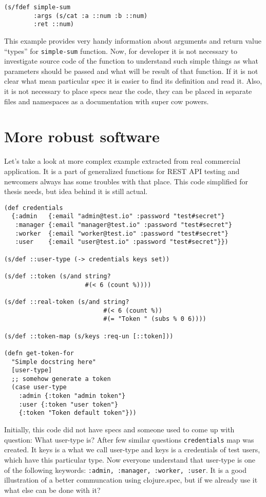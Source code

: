 \begin{verbatim}
(s/fdef simple-sum
        :args (s/cat :a ::num :b ::num)
        :ret ::num)
\end{verbatim}
This example provides very handy information about arguments and return value
``types'' for \texttt{simple-sum} function. Now, for developer it is not
necessary to investigate source code of the function to understand such simple
things as what parameters should be passed and what will be result of that
function. If it is not clear what mean particular spec it is easier to find its
definition and read it. Also, it is not necessary to place specs near the code,
they can be placed in separate files and namespaces as a documentation with
super cow powers.


\section{More robust software}

Let's take a look at more complex example extracted from real
commercial application. It is a part of generalized functions for REST API
testing and newcomers always has some troubles with that place. This code
simplified for thesis needs, but idea behind it is still actual.

\begin{verbatim}
(def credentials
  {:admin   {:email "admin@test.io" :password "test#secret"}
   :manager {:email "manager@test.io" :password "test#secret"}
   :worker  {:email "worker@test.io" :password "test#secret"}
   :user    {:email "user@test.io" :password "test#secret"}})

(s/def ::user-type (-> credentials keys set))

(s/def ::token (s/and string?
                      #(< 6 (count %))))

(s/def ::real-token (s/and string?
                           #(< 6 (count %))
                           #(= "Token " (subs % 0 6))))

(s/def ::token-map (s/keys :req-un [::token]))

(defn get-token-for
  "Simple docstring here"
  [user-type]
  ;; somehow generate a token
  (case user-type
    :admin {:token "admin token"}
    :user {:token "user token"}
    {:token "Token default token"}))
\end{verbatim}


Initially, this code did not have specs and someone used to come up with
question: What user-type is? After few similar questions
\texttt{credentials} map was created. It keys is a what we call user-type and
keys is a credentials of test users, which have this particular type. Now
everyone understand that user-type is one of the following keywords:
\texttt{:admin, :manager, :worker, :user}. It is a good illustration of a better
communcation using clojure.spec, but if we already use it what else can be done
with it?

